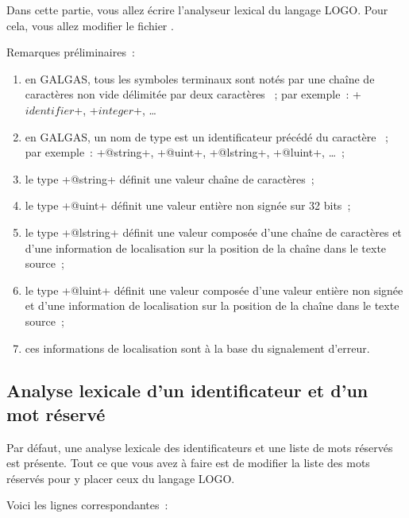 Dans cette partie, vous allez écrire l’analyseur lexical du langage LOGO. Pour cela, vous allez modifier le fichier .

Remarques préliminaires~:
\begin{enumerate}
  \item en GALGAS, tous les symboles terminaux sont notés par une chaîne de caractères non vide délimitée par deux caractères \tpp{\$}~; par exemple~: \ggst+$identifier$+, \ggst+$integer$+, …
  \item en GALGAS, un nom de type est un identificateur précédé du caractère ~; par exemple~: \ggst+@string+, \ggst+@uint+, \ggst+@lstring+, \ggst+@luint+, …~;
  \item le type \ggst+@string+ définit une valeur chaîne de caractères~;
  \item le type \ggst+@uint+ définit une valeur entière non signée sur 32 bits~;
  \item le type \ggst+@lstring+ définit une valeur composée d'une chaîne de caractères et d'une information de localisation sur la position de la chaîne dans le texte source~;
  \item le type \ggst+@luint+ définit une valeur composée d'une valeur entière non signée et d'une information de localisation sur la position de la chaîne dans le texte source~;
  \item ces informations de localisation sont à la base du signalement d'erreur.
\end{enumerate}

\subsection{Analyse lexicale d'un identificateur et d'un mot réservé}

Par défaut, une analyse lexicale des identificateurs et une liste de mots réservés est présente. Tout ce que vous avez à faire est de modifier la liste des mots réservés pour y placer ceux du langage LOGO.

Voici les lignes correspondantes~:


